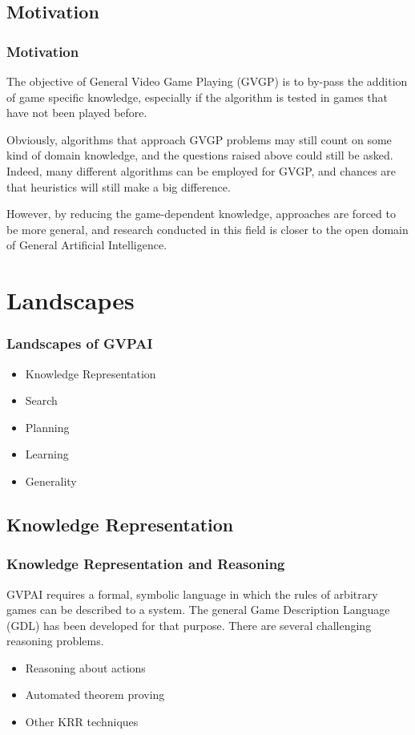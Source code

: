 \documentclass{beamer}
\begin{document}
\subsection{Motivation}
\begin{frame}
  \frametitle{Motivation\cite{2}}
  The objective of General Video Game Playing (GVGP) is to by-pass the addition of game specific knowledge, especially if the algorithm is tested in games that have not been played before.

  Obviously, algorithms that approach GVGP problems may still count on some kind of domain knowledge, and the questions raised above could still be asked. Indeed, many different algorithms can be employed for GVGP, and chances are that heuristics will still make a big difference.

  However, by reducing the game-dependent knowledge, approaches are forced to be more general, and research conducted in this field is closer to the open domain of General Artificial Intelligence.

\end{frame}



\section{Landscapes}
\begin{frame}
  \frametitle{Landscapes of GVPAI}
  \begin{itemize}
    \item Knowledge Representation
    \item Search
    \item Planning
    \item Learning
    \item Generality
  \end{itemize}
\end{frame}

\subsection{Knowledge Representation}
\begin{frame}
  \frametitle{Knowledge Representation and Reasoning\cite{3}}
  GVPAI requires a formal, symbolic language in which the rules of arbitrary games can be described to a system. The general Game Description Language (GDL) has been developed for that purpose. There are several challenging reasoning problems.
  \begin{itemize}
    \item Reasoning about actions
    \item Automated theorem proving
    \item Other KRR techniques
  \end{itemize}
\end{frame}
\end{document}
